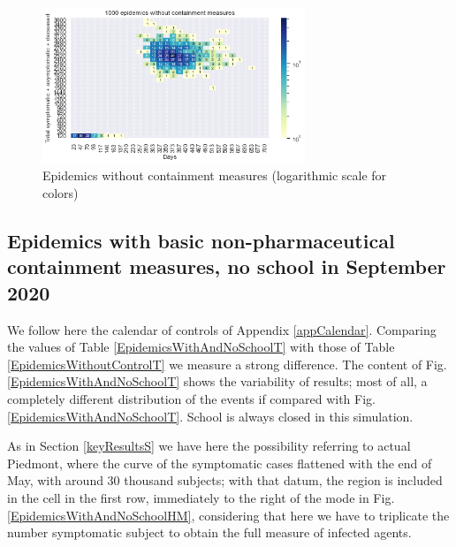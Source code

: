\documentclass[11pt]{article}
\begin{document}
\begin{figure}[H]
\begin{center}
\includegraphics[width=0.7\textwidth]{HM30_readRunResults1k_noControl_plusHMlog.png}
\caption{Epidemics without containment measures (logarithmic scale for colors)}
\label{EpidemicsWithoutControlHM}
\end{center}
\end{figure}

\subsection{Epidemics with basic non-pharmaceutical containment measures, no school in September 2020}
\label{EpidemicsWithAndNoSchoolS}

We follow here the calendar of controls of Appendix \ref{appCalendar}. Comparing the values of Table \ref{EpidemicsWithAndNoSchoolT} with those of Table \ref{EpidemicsWithoutControlT} we measure a strong difference. The content of Fig. \ref{EpidemicsWithAndNoSchoolT} shows the variability of results; most of all, a completely different distribution of the events if compared with Fig. \ref{EpidemicsWithAndNoSchoolT}. School is always closed in this simulation.

As in Section \ref{keyResultsS} we have here the possibility referring to actual Piedmont, where the curve of the symptomatic cases flattened with the end of May, with around 30 thousand subjects; with that datum, the region is included in the cell in the first row, immediately to the right of the mode in Fig. \ref{EpidemicsWithAndNoSchoolHM}, considering that here we have to triplicate the number symptomatic subject to obtain the full measure of infected agents.
\end{document}
